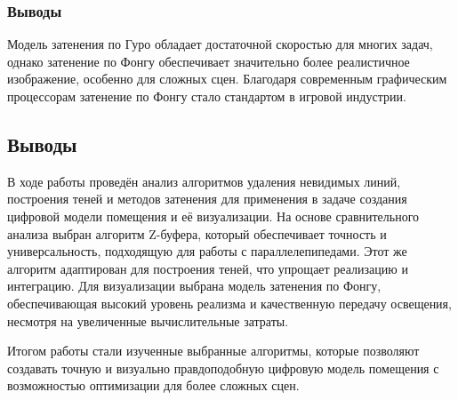\subsubsection{Выводы}

\hspace{1.25cm}
Модель затенения по Гуро обладает достаточной скоростью для многих задач, однако затенение по Фонгу обеспечивает значительно более реалистичное изображение, особенно для сложных сцен. Благодаря современным графическим процессорам затенение по Фонгу стало стандартом в игровой индустрии.~\cite{compgraphics}


\subsection{Выводы}

\hspace{1.25cm}
В ходе работы проведён анализ алгоритмов удаления невидимых линий, построения теней и методов затенения для применения в задаче создания цифровой модели помещения и её визуализации. На основе сравнительного анализа выбран алгоритм Z-буфера, который обеспечивает точность и универсальность, подходящую для работы с параллелепипедами. Этот же алгоритм адаптирован для построения теней, что упрощает реализацию и интеграцию. Для визуализации выбрана модель затенения по Фонгу, обеспечивающая высокий уровень реализма и качественную передачу освещения, несмотря на увеличенные вычислительные затраты.

Итогом работы стали изученные выбранные алгоритмы, которые позволяют создавать точную и визуально правдоподобную цифровую модель помещения с возможностью оптимизации для более сложных сцен.


\newpage